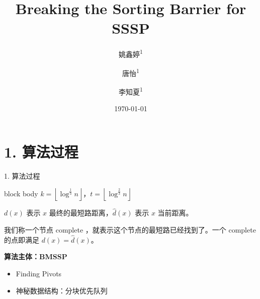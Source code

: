 \documentclass{beamer}
\title{Breaking the Sorting Barrier for SSSP}
\author[姚鑫婷、唐怡、李知夏]{姚鑫婷\textsuperscript{1} \and 唐怡\textsuperscript{1} \and 李知夏\textsuperscript{1}}
\institute{\textsuperscript{1}湖南大学\ 计算机学院}
\date{\today}
\begin{document}
\begin{frame}
  \titlepage
\end{frame}

\section{1. 算法过程}

\begin{frame}{1. 算法过程}
  \begin{beamercolorbox}[sep=0.55em,rounded=true,shadow=true,wd=\linewidth]{block body}
    \centering
    $k = \left \lfloor \log^{\frac{1}{3}}n \right \rfloor$，\quad $t = \left \lfloor \log^{\frac{2}{3}}n \right \rfloor$
  \end{beamercolorbox}

  \pause\vspace{0.45em}
  $d(x)$ 表示 $x$ 最终的最短路距离，$\hat{d}(x)$ 表示 $x$ 当前距离。

  \pause\vspace{0.45em}
  我们称一个节点 complete ，就表示这个节点的最短路已经找到了。一个 complete 的点即满足 $d(x) = \hat{d}(x)$。

  \pause\vspace{0.45em}
  \textbf{算法主体：BMSSP}

  \pause
  \begin{itemize}
    \item Finding Pivots
    \item 神秘数据结构：分块优先队列
  \end{itemize}
\end{frame}
\end{document}

